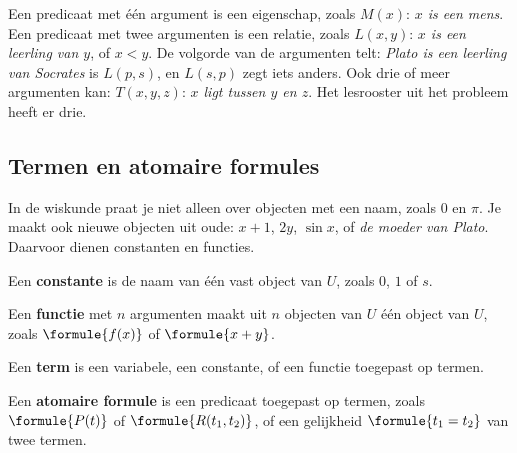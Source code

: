 Een predicaat met één argument is een eigenschap, zoals $M(x)$: \textit{$x$ is een mens}. Een predicaat met twee argumenten is een relatie, zoals $L(x, y)$: \textit{$x$ is een leerling van $y$}, of $x < y$. De volgorde van de argumenten telt: \textit{Plato is een leerling van Socrates} is $L(p, s)$, en $L(s, p)$ zegt iets anders. Ook drie of meer argumenten kan: $T(x, y, z)$: \textit{$x$ ligt tussen $y$ en $z$}. Het lesrooster uit het probleem heeft er drie.


\begin{oefeningen}
\end{oefeningen}

\subsection{Termen en atomaire formules}

In de wiskunde praat je niet alleen over objecten met een naam, zoals 0 en $\pi$. Je maakt ook nieuwe objecten uit oude: $x + 1$, $2y$, $\sin x$, of \textit{de moeder van Plato}. Daarvoor dienen constanten en functies.

\begin{theorie}
Een \textbf{\textcolor{accent}{constante}} is de naam van één vast object van $U$, zoals $0$, $1$ of $s$.

\vspace{1mm}
Een \textbf{\textcolor{accent}{functie}} met $n$ argumenten maakt uit $n$ objecten van $U$ één object van $U$, zoals $\formule{f(x)}$ of $\formule{x + y}$.

\vspace{1mm}
Een \textbf{\textcolor{accent}{term}} is een variabele, een constante, of een functie toegepast op termen.

\vspace{1mm}
Een \textbf{\textcolor{accent}{atomaire formule}} is een predicaat toegepast op termen, zoals $\formule{P(t)}$ of $\formule{R(t_1, t_2)}$, of een gelijkheid $\formule{t_1 = t_2}$ van twee termen.
\end{theorie}

